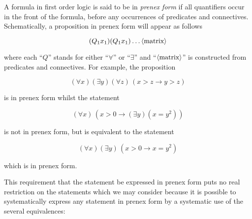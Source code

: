 \documentclass[12pt]{article}
\begin{document}
A formula in first order logic is said to be in \emph{prenex form} if all quantifiers occur in the front of the formula, before any occurrences of predicates and connectives.  Schematically, a proposition in prenex form will appear as follows

\[ (Q_1 x_1) (Q_1 x_1) \hdots \langle \hbox{matrix} \rangle \]

where each ``$Q$'' stands for either ``$\forall$'' or ``$\exists$'' and  ``$\langle \hbox{matrix} \rangle$'' is constructed from predicates and connectives.  For example, the proposition

\[ (\forall x) (\exists y) (\forall z) \, (x > z \rightarrow y > z) \]

is in prenex form whilst the statement

\[ (\forall x) \, (x > 0 \rightarrow (\exists y) (x = y^2)) \]

is not in prenex form, but is equivalent to the statement

\[ (\forall x) (\exists y) \, (x > 0 \rightarrow x = y^2) \]

which is in prenex form.

This requirement that the statement be expressed in prenex form puts no real restriction on the statements which we may consider because it is possible to systematically express any statement in prenex form by a systematic use of the several equivalences:
\end{document}
